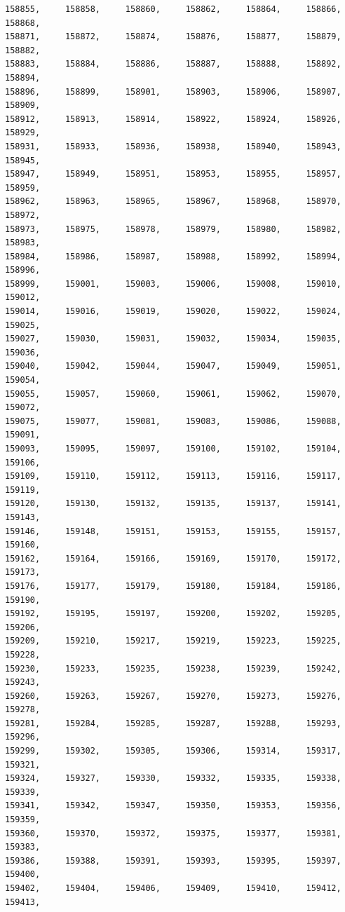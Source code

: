 \documentclass[a4paper,11pt]{report}
\begin{document}
\begin{verbatim}
158855,     158858,     158860,     158862,     158864,     158866,     158868,
158871,     158872,     158874,     158876,     158877,     158879,     158882,
158883,     158884,     158886,     158887,     158888,     158892,     158894,
158896,     158899,     158901,     158903,     158906,     158907,     158909,
158912,     158913,     158914,     158922,     158924,     158926,     158929,
158931,     158933,     158936,     158938,     158940,     158943,     158945,
158947,     158949,     158951,     158953,     158955,     158957,     158959,
158962,     158963,     158965,     158967,     158968,     158970,     158972,
158973,     158975,     158978,     158979,     158980,     158982,     158983,
158984,     158986,     158987,     158988,     158992,     158994,     158996,
158999,     159001,     159003,     159006,     159008,     159010,     159012,
159014,     159016,     159019,     159020,     159022,     159024,     159025,
159027,     159030,     159031,     159032,     159034,     159035,     159036,
159040,     159042,     159044,     159047,     159049,     159051,     159054,
159055,     159057,     159060,     159061,     159062,     159070,     159072,
159075,     159077,     159081,     159083,     159086,     159088,     159091,
159093,     159095,     159097,     159100,     159102,     159104,     159106,
159109,     159110,     159112,     159113,     159116,     159117,     159119,
159120,     159130,     159132,     159135,     159137,     159141,     159143,
159146,     159148,     159151,     159153,     159155,     159157,     159160,
159162,     159164,     159166,     159169,     159170,     159172,     159173,
159176,     159177,     159179,     159180,     159184,     159186,     159190,
159192,     159195,     159197,     159200,     159202,     159205,     159206,
159209,     159210,     159217,     159219,     159223,     159225,     159228,
159230,     159233,     159235,     159238,     159239,     159242,     159243,
159260,     159263,     159267,     159270,     159273,     159276,     159278,
159281,     159284,     159285,     159287,     159288,     159293,     159296,
159299,     159302,     159305,     159306,     159314,     159317,     159321,
159324,     159327,     159330,     159332,     159335,     159338,     159339,
159341,     159342,     159347,     159350,     159353,     159356,     159359,
159360,     159370,     159372,     159375,     159377,     159381,     159383,
159386,     159388,     159391,     159393,     159395,     159397,     159400,
159402,     159404,     159406,     159409,     159410,     159412,     159413,

\end{verbatim}
\end{document}
